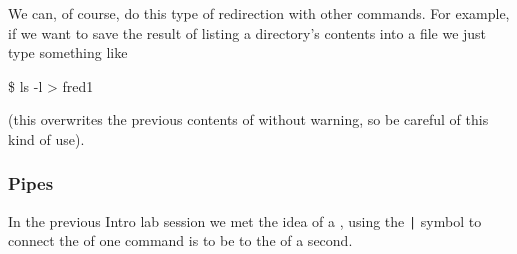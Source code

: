 We can, of course, do this type of redirection with other
commands. For example, if we want to save the result of listing a
directory's contents into a file we just type something like
\begin{ttoutenv}
\$  ls -l > fred1
\end{ttoutenv}
(this overwrites the previous contents of  without
warning, so be careful of this kind of use).


\subsubsection{Pipes} 





In the previous Intro lab session we met the idea of a , using the \verb+|+ symbol to connect the  of one command is to be  to the
 of a second.

